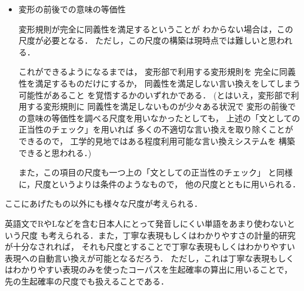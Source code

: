 {\begin{itemize}
  \begin{itemize}
  \item 
    対象としている表現が，コーパスで1回以上出現しているか否か．
    (これは表記誤りの検出など\cite{takeuchi99,Murata_ieice_negative_example}によく使われる尺度である．)

  \item 
    コーパスでの生起確率がある程度以上か否か．

  \item 
    コーパスでの生起確率が，環境なしでの生起確率よりも大きいか否か．

  \end{itemize}
  
  ここで示したものは，尺度というよりは条件のようなもので，
  他の尺度と組み合わせて用いるとよい．
  他の尺度のところで，もしその変形において，
  文としての正当性が保証されない場合は，
  ここで示した尺度を同時に用いるとよい．

\item 
  変形の前後での意味の等価性

  変形規則が完全に同義性を満足するということが
  わからない場合は，この尺度が必要となる．
  ただし，この尺度の構築は現時点では難しいと思われる．

  これができるようになるまでは，
  変形部で利用する変形規則を
  完全に同義性を満足するものだけにするか，
  同義性を満足しない言い換えをしてしまう可能性があること
  を覚悟するかのいずれかである．
  (とはいえ，変形部で利用する変形規則に
  同義性を満足しないものが少々ある状況で
  変形の前後での意味の等価性を調べる尺度を用いなかったとしても，
  上述の「文としての正当性のチェック」を用いれば
  多くの不適切な言い換えを取り除くことができるので，
  工学的見地ではある程度利用可能な言い換えシステムを
  構築できると思われる．)

  また，この項目の尺度も一つ上の「文としての正当性のチェック」
  と同様に，尺度というよりは条件のようなもので，
  他の尺度とともに用いられる．

\end{itemize}}
ここにあげたもの以外にも様々な尺度が考えられる．

英語文でRやLなどを含む日本人にとって発音しにくい\cite{eigo_goto,SLA}単語をあまり使わないという尺度
も考えられる．また，丁寧な表現もしくはわかりやすさの計量的研究が十分なされれば，
それも尺度とすることで丁寧な表現もしくはわかりやすい表現への自動言い換えが可能となるだろう．
ただし，これは丁寧な表現もしくはわかりやすい表現のみを使ったコーパスを生起確率の算出に用いることで，
先の生起確率の尺度でも扱えることである．


